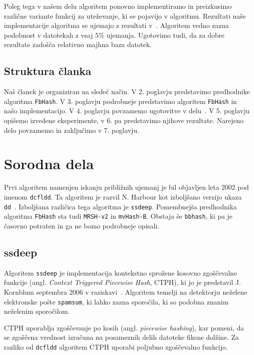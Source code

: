 \documentclass{acm_proc_article-sp}
\begin{document}
Poleg tega v našem delu algoritem ponovno implementiramo in preizkusimo različne variante funkcij za uteževanje, ki se pojavijo v algoritmu. Rezultati naše implementacije algoritma se ujemajo z rezultati v~\cite{fbhash}. Algoritem vedno zazna podobnost v datotekah z vsaj $5\%$ ujemanja. Ugotovimo tudi, da za dobre rezultate zadošča relativno majhna baza datotek.

\subsection{Struktura članka}

Naš članek je organiziran na sledeč način. V 2. poglavju predstavimo predhodnike algoritma \texttt{FbHash}. V 3. poglavju podrobneje predstavimo algoritem \texttt{FbHash} in našo implementacijo. V 4. poglavju povzamemo ugotovitve v delu~\cite{fbhash}. V 5. poglavju opišemo izvedene eksperimente, v 6. pa predstavimo njihove rezultate. Narejeno delo povzamemo in zaključimo v 7. poglavju.

\section{Sorodna dela}
Prvi algoritem namenjen iskanju približnih ujemanj je bil objavljen leta 2002 pod imenom \texttt{dcfldd}. Ta algoritem je razvil N. Harbour kot izboljšano verzijo ukaza \texttt{dd}~\cite{dcfldd}. Izboljšana različica tega algoritma je \texttt{ssdeep}. Pomembnejša predhodnika algoritma \texttt{FbHash} sta tudi \texttt{MRSH-v2} in \texttt{mvHash-B}. Obstaja še \texttt{bbhash}, ki pa je časovno potraten in ga ne bomo podrobneje opisali.

\subsection{ssdeep}
Algoritem \texttt{ssdeep} je implementacija kontekstno sprožene kosovno zgoščevalne funkcije (angl. \emph{Context Triggered Piecewise Hash}, CTPH), ki jo je predstavil J. Kornblum septembra 2006 v raziskavi~\cite{kornblum:ctph}. Algoritem temelji na detektorju neželene elektronske pošte \texttt{spamsum}, ki lahko zazna sporočila, ki so podobna znanim neželenim sporočilom.

CTPH uporablja zgoščevanje po kosih (angl. \emph{piecewise hashing}), kar pomeni, da se zgoščena vrednost izračuna na posameznih delih datoteke fiksne dolžine. Za razliko od \texttt{dcfldd} algoritem CTPH uporabi poljubno zgoščevalno funkcijo.
\end{document}
